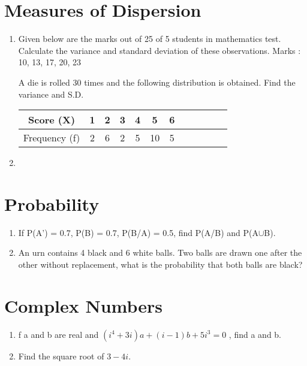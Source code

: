 \documentclass[14pt]{article}
\begin{document}
\begin{multicols}{2}
\section{Measures of Dispersion}
\noindent
\begin{enumerate}
\item Given below are the marks out of 25
of 5 students in mathematics test. Calculate
the variance and standard deviation of these
observations. Marks : 10, 13, 17, 20, 23

A die is rolled 30 times and the following
distribution is obtained. Find the variance and
S.D.

\begin{tabular}{|c|*{11}{c|}}
\hline Score (X) & 1 & 2 & 3 & 4 & 5 & 6 \\
\hline Frequency (f) & 2 & 6 & 2 & 5 & 10 & 5 \\
\hline
\end{tabular}

\item

\end{enumerate} 

\section{Probability}
\noindent
\begin{enumerate}
\item If P(A') = 0.7, P(B) = 0.7, P(B/A) =
0.5, find P(A/B) and P(A$\cup$B).

\item An urn contains 4 black and 6 white
balls. Two balls are drawn one after the other
without replacement, what is the probability that
both balls are black?

\end{enumerate} 

\section{Complex Numbers}
\noindent
\begin{enumerate}
\item f a and b are real and
$(i^4 +3i)a + (i-1)b + 5i^3 = 0$ , find a and b.

\item Find the square root of $3 - 4i$.

\end{enumerate} 


\end{multicols}
\end{document}
